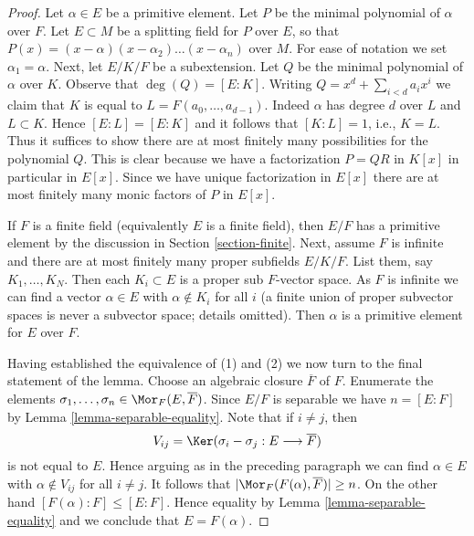 \begin{proof}
Let $\alpha \in E$ be a primitive element. Let $P$ be the minimal
polynomial of $\alpha$ over $F$. Let $E \subset M$ be a splitting
field for $P$ over $E$, so that
$P(x) = (x - \alpha)(x - \alpha_2) \ldots (x - \alpha_n)$ over $M$.
For ease of notation we set $\alpha_1 = \alpha$.
Next, let $E/K/F$ be a subextension. Let $Q$ be the minimal
polynomial of $\alpha$ over $K$. Observe that $\deg(Q) = [E : K]$.
Writing $Q = x^d + \sum_{i < d} a_i x^i$ we claim that
$K$ is equal to $L = F(a_0, \ldots, a_{d - 1})$. Indeed $\alpha$ has degree
$d$ over $L$ and $L \subset K$. Hence $[E : L] = [E : K]$ and it follows
that $[K : L] = 1$, i.e., $K = L$.
Thus it suffices to show there are at most finitely many possibilities
for the polynomial $Q$. This is clear because we have a factorization
$P = QR$  in $K[x]$ in particular in $E[x]$. Since we have unique
factorization in $E[x]$ there are at most finitely many monic
factors of $P$ in $E[x]$.

\medskip\noindent
If $F$ is a finite field (equivalently $E$ is a finite field), then
$E/F$ has a primitive element by the discussion in
Section \ref{section-finite}.
Next, assume $F$ is infinite and there are at most finitely many proper
subfields $E/K/F$. List them, say $K_1, \ldots, K_N$. Then
each $K_i \subset E$ is a proper sub $F$-vector space. As $F$ is infinite
we can find a vector $\alpha \in E$ with $\alpha \not \in K_i$ for all $i$
(a finite union of proper subvector spaces is never a subvector space;
details omitted). Then $\alpha$ is a primitive element for $E$ over $F$.

\medskip\noindent
Having established the equivalence of (1) and (2) we now turn to
the final statement of the lemma. Choose an algebraic closure
$\overline{F}$ of $F$. Enumerate the elements
$\sigma_1, \ldots, \sigma_n \in \Mor_F(E, \overline{F})$.
Since $E/F$ is separable we have $n = [E : F]$ by
Lemma \ref{lemma-separable-equality}.
Note that if $i \not = j$, then
$$
V_{ij} = \Ker(\sigma_i - \sigma_j : E \longrightarrow \overline{F})
$$
is not equal to $E$. Hence arguing as in the preceding paragraph
we can find $\alpha \in E$ with $\alpha \not \in V_{ij}$ for all
$i \not = j$. It follows that $|\Mor_F(F(\alpha), \overline{F})| \geq n$.
On the other hand $[F(\alpha) : F] \leq [E : F]$. Hence equality
by Lemma \ref{lemma-separable-equality}
and we conclude that $E = F(\alpha)$.
\end{proof}






